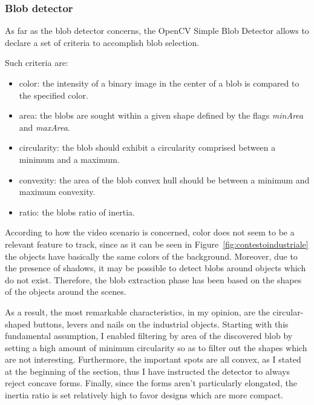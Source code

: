 \documentclass[journal]{IEEEtran}
\begin{document}
\subsubsection{Blob detector}
As far as the blob detector concerns, the OpenCV Simple Blob Detector allows to declare a set of criteria to accomplish blob selection.

Such criteria are: 
\begin{itemize}
    \item color: the intensity of a binary image in the center of a blob is compared to the specified color.
    \item area: the blobs are sought within a given shape defined by the flags \emph{minArea} and \emph{maxArea}.
    \item circularity: the blob should exhibit a circularity comprised between a minimum and a maximum.
    \item convexity: the area of the blob convex hull should be between a minimum and maximum convexity.
    \item ratio: the blobs ratio of inertia. 
\end{itemize}

According to how the video scenario is concerned, color does not seem to be a relevant feature to track, since as it can be seen in Figure~\ref{fig:contestoindustriale} the objects have basically the same colors of the background. Moreover, due to the presence of shadows, it may be possible to detect blobs around objects which do not exist. Therefore, the blob extraction phase has been based on the shapes of the objects around the scenes.

As a result, the most remarkable characteristics, in my opinion, are the circular-shaped buttons, levers and nails on the industrial objects.
Starting with this fundamental assumption, I enabled filtering by area of the discovered blob by setting a high amount of minimum circularity so as to filter out the shapes which are not interesting.
Furthermore, the important spots are all convex, as I stated at the beginning of the section, thus I have instructed the detector to always reject concave forms.
Finally, since the forms aren't particularly elongated, the inertia ratio is set relatively high to favor designs which are more compact.
\end{document}

